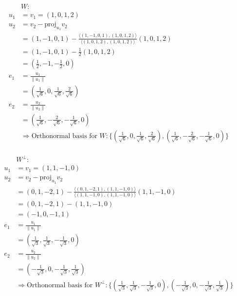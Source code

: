 \documentclass{article}
\def\proj{\text{proj}}
\begin{document}
\begin{equation*}
    \begin{split}
        &W:\\
        u_1&=v_1=(1,0,1,2)\\
        u_2&=v_2-\proj_{u_1}v_2\\
        &=(1,-1,0,1)-\frac{\langle(1,-1,0,1),(1,0,1,2)\rangle}{\langle(1,0,1,2),(1,0,1,2)\rangle}(1,0,1,2)\\
        &=(1,-1,0,1)-\frac{1}{2}(1,0,1,2)\\
        &=(\frac{1}{2},-1,-\frac{1}{2},0)\\
        e_1&=\frac{u_1}{\|u_1\|}\\
        &=(\frac{1}{\sqrt{6}},0,\frac{1}{\sqrt{6}},\frac{2}{\sqrt{6}})\\
        e_2&=\frac{u_2}{\|u_2\|}\\
        &=(\frac{1}{\sqrt{6}},-\frac{2}{\sqrt{6}},-\frac{1}{\sqrt{6}},0)\\
        &\Rightarrow\text{Orthonormal basis for }W:\{(\frac{1}{\sqrt{6}},0,\frac{1}{\sqrt{6}},\frac{2}{\sqrt{6}}),(\frac{1}{\sqrt{6}},-\frac{2}{\sqrt{6}},-\frac{1}{\sqrt{6}},0)\}\\
    \end{split}
\end{equation*}

\begin{equation*}
    \begin{split}
        &W^\perp:\\
        u_1&=v_1=(1,1,-1,0)\\
        u_2&=v_2-\proj_{u_1}v_2\\
        &=(0,1,-2,1)-\frac{\langle(0,1,-2,1),(1,1,-1,0)\rangle}{\langle(1,1,-1,0),(1,1,-1,0)\rangle}(1,1,-1,0)\\
        &=(0,1,-2,1)-(1,1,-1,0)\\
        &=(-1,0,-1,1)\\
        e_1&=\frac{u_1}{\|u_1\|}\\
        &=(\frac{1}{\sqrt{3}},\frac{1}{\sqrt{3}},-\frac{1}{\sqrt{3}},0)\\
        e_2&=\frac{u_2}{\|u_2\|}\\
        &=(-\frac{1}{\sqrt{3}},0,-\frac{1}{\sqrt{3}},\frac{1}{\sqrt{3}})\\
        &\Rightarrow\text{Orthonormal basis for }W^\perp:\{(\frac{1}{\sqrt{3}},\frac{1}{\sqrt{3}},-\frac{1}{\sqrt{3}},0),(-\frac{1}{\sqrt{3}},0,-\frac{1}{\sqrt{3}},\frac{1}{\sqrt{3}})\}\\
    \end{split}
\end{equation*}
\end{document}
